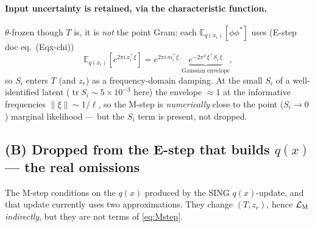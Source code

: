 \documentclass[11pt]{article}
\newcommand{\Eqx}{\mathbb{E}_{q(x_i)}}
\newcommand{\tr}{\operatorname{tr}}
\begin{document}
\paragraph{Input uncertainty is retained, via the characteristic function.}
$\theta$-frozen though $T$ is, it is \emph{not} the point Gram: each
$\Eqx[\phi\phi^*]$ uses (E-step doc eq.~(Eqx-chi))
\begin{equation}
\Eqx[e^{2\pi i\,x_i^\top\xi}]=e^{2\pi i\,m_i^\top\xi}\;\underbrace{e^{-2\pi^2\,\xi^\top S_i\,\xi}}_{\text{Gaussian envelope}},
\label{eq:chi}
\end{equation}
so $S_i$ enters $T$ (and $z_r$) as a frequency-domain damping. At the small $S_i$ of a
well-identified latent ($\tr S_i\!\sim\!5\!\times\!10^{-3}$ here) the envelope
$\approx1$ at the informative frequencies $\|\xi\|\!\sim\!1/\ell$, so the M-step is
\emph{numerically} close to the point ($S_i\!\to\!0$) marginal likelihood --- but the
$S_i$ term is present, not dropped.

\subsection*{(B) Dropped from the E-step that builds $q(x)$ --- the real omissions}
The M-step conditions on the $q(x)$ produced by the SING $q(x)$-update, and that
update currently uses two approximations. They change $(T,z_r)$, hence $\mathcal
L_{\rm M}$ \emph{indirectly}, but they are not terms of \eqref{eq:Mstep}.
\end{document}
